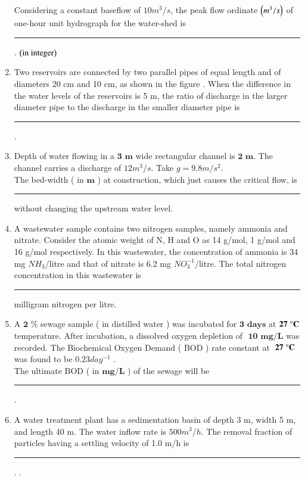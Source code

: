 \documentclass[journal]{IEEEtran}
\begin{document}
\begin{enumerate}
		
		Considering a constant baseflow of $ 10 m^3/s$, the peak flow ordinate $\left(m^3/s\right)$ of one-hour unit hydrograph for the water-shed is \rule{1cm}{0.1pt}. $\left(\text{in integer}\right)$
	\item Two reservoirs are connected by two parallel pipes of equal length and of diameters 20 cm and 10 cm, as shown in the  figure . When the difference in the water levels of the reservoirs is 5 m, the ratio of discharge in the larger diameter pipe to the discharge in the smaller diameter pipe is \rule{1cm}{0.1pt} .  \\
		\begin{figure}[H]
			\centering
			
			\label{tab: Q_57}
		\end{figure}
	\item Depth of water flowing in a $\textbf{3 m}$ wide rectangular channel is $\textbf{2 m}$. The channel carries a discharge of \textbf{$12 m^3/s$}. Take \textbf{$g = 9.8 m/s^2$}. \\
		The bed-width ( in $\textbf{m}$ ) at construction, which just causes the critical flow, is \rule{1cm}{0.1pt} without changing the upstream water level. 
	\item A wastewater sample contains two nitrogen samples, namely ammonia and nitrate. Consider the atomic weight of N, H and O as 14 g/mol, 1 g/mol and 16 g/mol respectively. In this wastewater, the concentration of ammonia is 34 mg $NH_3$/litre and that of nitrate is 6.2 mg $NO_3^{-1}$/litre. The total nitrogen concentration in this wastewater is \rule{1cm}{0.1pt} milligram nitrogen per litre. 
	\item A $\textbf{2 \%}$ sewage sample ( in distilled water ) was incubated for $\textbf{3 days}$ at $\textbf{27 \degree C}$ temperature. After incubation, a dissolved oxygen depletion of $\textbf{ 10 mg/L}$ was recorded. The Biochemical Oxygen Demand ( BOD ) rate constant at $\textbf{ 27 \degree C}$ was found to be \textbf{ $0.23 day^{-1}$} . \\
		The ultimate BOD ( in $\textbf{mg/L}$ ) of the sewage will be \rule{1cm}{0.1pt}. 
	\item A water treatment plant has a sedimentation basin of depth 3 m, width 5 m, and length 40 m. The water inflow rate is $ 500 m^3/h $. The removal fraction of particles having a settling velocity of 1.0 m/h is \rule{1cm}{0.1pt} . . \\

\end{enumerate}
\end{document}
